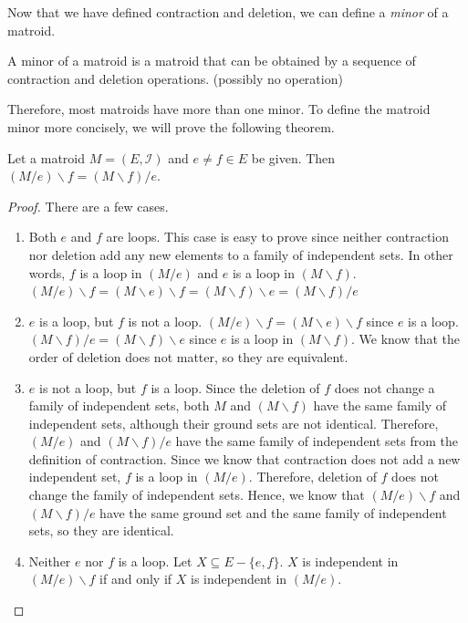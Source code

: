 Now that we have defined contraction and deletion, we can define a \textit{minor} of a matroid.

\begin{defn}
A minor of a matroid is a matroid that can be obtained by a sequence of contraction and deletion operations. (possibly no operation)
\end{defn}

Therefore, most matroids have more than one minor.
To define the matroid minor more concisely, we will prove the following theorem.


\begin{thm}
Let a matroid $M = (E, \mathcal{I})$ and $e \neq f \in E$ be given.
Then $(M / e) \backslash f = (M \backslash f) / e$.
\end{thm}

\begin{proof}
There are a few cases.
\begin{enumerate}
\item
Both $e$ and $f$ are loops.
This case is easy to prove since neither contraction nor deletion add any new elements to a family of independent sets.
In other words, $f$ is a loop in $(M / e)$ and $e$ is a loop in $(M \backslash f)$.
$(M / e) \backslash f = (M \backslash e) \backslash f = (M \backslash f) \backslash e = (M \backslash f) / e$
\item
$e$ is a loop, but $f$ is not a loop.
$(M / e) \backslash f = (M \backslash e) \backslash f$ since $e$ is a loop.
$(M \backslash f) / e = (M \backslash f) \backslash e$ since $e$ is a loop in $(M \backslash f)$.
We know that the order of deletion does not matter, so they are equivalent.
\item
$e$ is not a loop, but $f$ is a loop.
Since the deletion of $f$ does not change a family of independent sets,
both $M$ and $(M \backslash f)$ have the same family of independent sets, although their ground sets are not identical.
Therefore, $(M / e)$ and $(M \backslash f) / e$ have the same family of independent sets from the definition of contraction.
Since we know that contraction does not add a new independent set, $f$ is a loop in $(M / e)$.
Therefore, deletion of $f$ does not change the family of independent sets.
Hence, we know that $(M / e) \backslash f$ and $(M \backslash f) / e$ have the same ground set and the same family of independent sets, so they are identical.
\item
Neither $e$ nor $f$ is a loop.
Let $X \subseteq E - \{e, f\}$.
$X$ is independent in $(M / e) \backslash f$ if and only if $X$ is independent in $(M / e)$.

\end{enumerate}
\end{proof}
